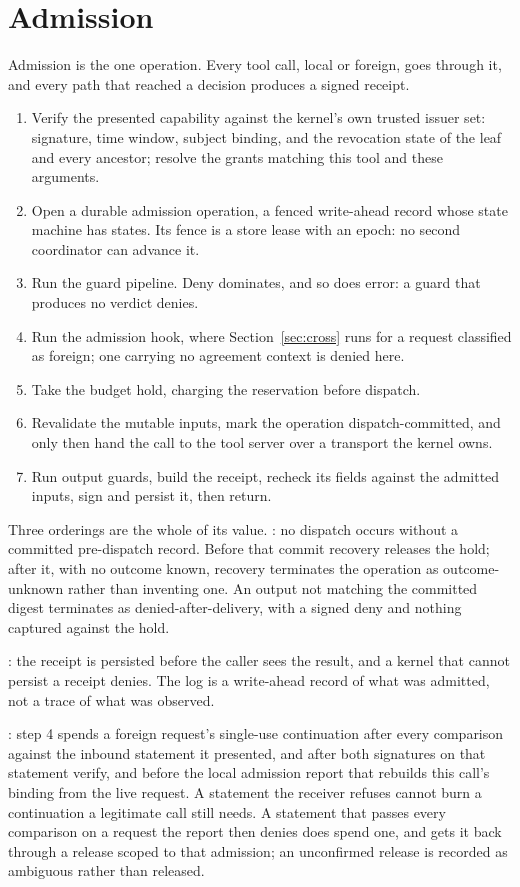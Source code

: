 \section{Admission}
\label{sec:admission}

Admission is the one operation. Every tool call, local or foreign, goes through
it, and every path that reached a decision produces a signed receipt.

\begin{enumerate}\itemsep0pt
\item Verify the presented capability against the kernel's own trusted issuer
  set: signature, time window, subject binding, and the revocation state of the
  leaf and every ancestor; resolve the grants matching this tool and these
  arguments.
\item Open a durable admission operation, a fenced write-ahead record whose
  state machine has \PSAdmissionStateCount{} states. Its fence is a store lease
  with an epoch: no second coordinator can advance it.
\item Run the guard pipeline. Deny dominates, and so does error: a guard that
  produces no verdict denies.
\item Run the admission hook, where Section~\ref{sec:cross} runs for a request
  classified as foreign; one carrying no agreement context is denied here.
\item Take the budget hold, charging the reservation before dispatch.
\item Revalidate the mutable inputs, mark the operation dispatch-committed, and
  only then hand the call to the tool server over a transport the kernel owns.
\item Run output guards, build the receipt, recheck its fields against the
  admitted inputs, sign and persist it, then return.
\end{enumerate}

Three orderings are the whole of its value. : no
dispatch occurs without a committed pre-dispatch record. Before that commit
recovery releases the hold; after it, with no outcome known, recovery terminates
the operation as outcome-unknown rather than inventing one. An output not
matching the committed digest terminates as denied-after-delivery, with a signed
deny and nothing captured against the hold.

: the receipt is persisted before the caller sees
the result, and a kernel that cannot persist a receipt denies. The log is a
write-ahead record of what was admitted, not a trace of what was observed.

: step 4 spends a foreign request's single-use
continuation after every comparison against the inbound statement it presented,
and after both signatures on that statement verify, and before the local
admission report that rebuilds this call's binding from the live request. A
statement the receiver refuses cannot burn a continuation a legitimate call
still needs. A statement that passes every comparison on a request the report
then denies does spend one, and gets it back through a release scoped to that
admission; an unconfirmed release is recorded as ambiguous rather than
released.
